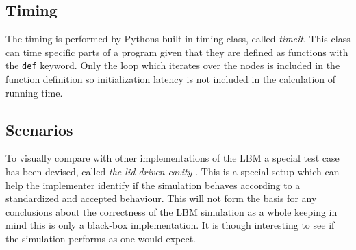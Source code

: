 \subsection{Timing}
The timing is performed by Pythons built-in timing class, called \textit{timeit}. This class can time specific parts of a program given that they are defined as functions with the \texttt{def} keyword. Only the loop which iterates over the nodes is included in the function definition so initialization latency is not included in the calculation of running time.

\subsection{Scenarios}
To visually compare with other implementations of the LBM a special test case has been devised, called \emph{the lid driven cavity} \cite{lid}. This is a special setup which can help the implementer identify if the simulation behaves according to a standardized and accepted behaviour. This will not form the basis for any conclusions about the correctness of the LBM simulation as a whole keeping in mind this is only a black-box implementation. It is though interesting to see if the simulation performs as one would expect.